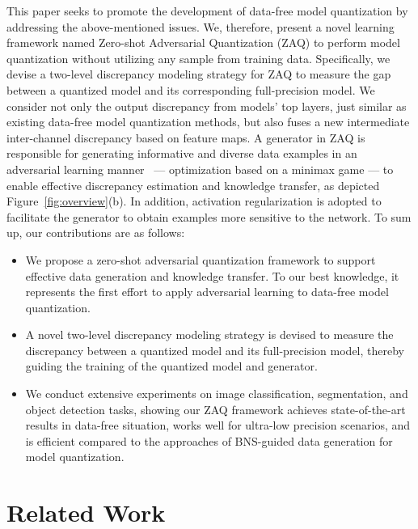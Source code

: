 \documentclass[final]{cvpr}
\begin{document}
This paper seeks to promote the development of data-free model quantization by addressing the above-mentioned issues.
We, therefore, present a novel learning framework named Zero-shot Adversarial Quantization (ZAQ) to perform model quantization without utilizing any sample from training data.
Specifically, we devise a two-level discrepancy modeling strategy for ZAQ to measure the gap between a quantized model and its corresponding full-precision model.
We consider not only the output discrepancy from models' top layers, just similar as existing data-free model quantization methods, but also fuses a new intermediate inter-channel discrepancy based on feature maps.
A generator in ZAQ is responsible for generating informative and diverse data examples in an adversarial learning manner~\cite{goodfellow2014generative} --- optimization based on a minimax game --- to enable effective discrepancy estimation and knowledge transfer, as depicted Figure~\ref{fig:overview}(b).
In addition, activation regularization is adopted to facilitate the generator to obtain examples more sensitive to the network.
To sum up, our contributions are as follows:
\begin{itemize}
  \item We propose a zero-shot adversarial quantization framework to support effective data generation and knowledge transfer.
  To our best knowledge, it represents the first effort to apply adversarial learning to data-free model quantization.
  
  \item A novel two-level discrepancy modeling strategy is devised to measure the discrepancy between a quantized model and its full-precision model, thereby guiding the training of the quantized model and generator.
  
  \item We conduct extensive experiments on image classification, segmentation, and object detection tasks, showing our ZAQ framework achieves state-of-the-art results in data-free situation, works well for ultra-low precision scenarios, and is efficient compared to the approaches of BNS-guided data generation for model quantization.

\end{itemize} 


\section{Related Work}
\end{document}
